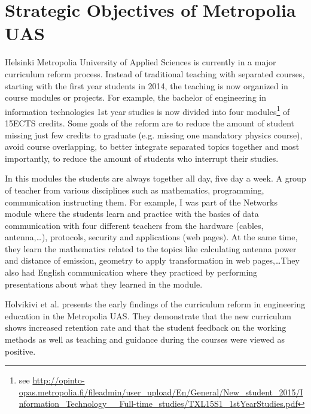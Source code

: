 \section{Strategic Objectives of Metropolia UAS}

Helsinki Metropolia University of Applied Sciences is currently in a major curriculum reform process. 
Instead of traditional teaching with separated courses, starting with the first year students in 2014, the teaching is now organized in course modules or projects. 
For example, the bachelor of engineering in information technologies 1st year studies is now divided into four modules\footnote{see \url{http://opinto-opas.metropolia.fi/fileadmin/user_upload/En/General/New_student_2015/Information_Technology__Full-time_studies/TXL15S1_1stYearStudies.pdf}} of 15ECTS credits. 
Some goals of the reform are to reduce the amount of student missing just few credits to graduate (e.g. missing one mandatory physics course), avoid course overlapping, to better integrate separated topics together and most importantly, to reduce the amount of students who interrupt their studies.

In this modules the students are always together all day, five day a week. A group of teacher from various disciplines such as mathematics, programming, communication instructing them. For example, I was part of the Networks module where the students learn and practice with the basics of data communication with four different teachers from the hardware (cables, antenna,\ldots), protocols, security and applications (web pages). At the same time, they learn the mathematics related to the topics like calculating antenna power and distance of emission, geometry to apply transformation in web pages,\ldots They also had English communication where they practiced by performing presentations about what they learned in the module.

Holvikivi et al. \cite{holvikivi_2015} presents the early findings of the curriculum reform in engineering education in the Metropolia UAS. 
They demonstrate that the new curriculum shows increased retention rate and that the student feedback on the working methods as well as teaching and guidance during the courses were viewed as positive.

  
  